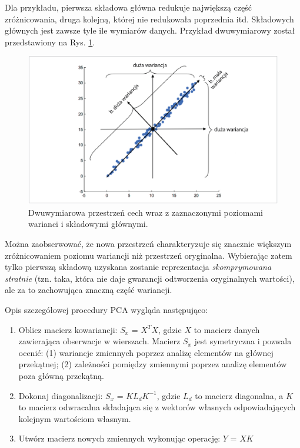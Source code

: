 Dla przykładu, pierwsza składowa główna redukuje największą część zróżnicowania, druga kolejną, której nie redukowała poprzednia itd. Składowych głównych jest zawsze tyle ile wymiarów danych. Przykład dwuwymiarowy został przedstawiony na Rys. \ref{PCA-2dim}.
\begin{figure}[h!]
	\centering
	\includegraphics[width=1\textwidth]{figures/PCA.png}
	\caption{Dwuwymiarowa przestrzeń cech wraz z zaznaczonymi poziomami warianci i składowymi głównymi.}
	\label{PCA-2dim}
\end{figure}
Można zaobserwować, że nowa przestrzeń charakteryzuje się znacznie większym zróżnicowaniem poziomu wariancji niż przestrzeń oryginalna. Wybierając zatem tylko pierwszą składową uzyskana zostanie reprezentacja \textit{skomprymowana stratnie} (tzn. taka, która nie daje gwarancji odtworzenia oryginalnych wartości), ale za to zachowująca znaczną część wariancji.

Opis szczegółowej procedury PCA wygląda następująco:
\begin{enumerate}
\item Oblicz macierz kowariancji: $S_x$ = $X^{T}X$, gdzie $X$ to macierz danych zawierająca obserwacje w wierszach. Macierz $S_x$ jest symetryczna i pozwala ocenić: (1) wariancje zmiennych poprzez analizę elementów na głównej przekątnej; (2) zależności pomiędzy zmiennymi poprzez analizę elementów poza główną przekątną. 
\item Dokonaj diagonalizacji: $S_x$ = $KL_dK^{-1}$, gdzie $L_d$ to macierz diagonalna, a $K$ to macierz odwracalna składająca się z wektorów własnych odpowiadających kolejnym wartościom własnym.
\item Utwórz macierz nowych zmiennych wykonując operację: $Y$ = $XK$
\end{enumerate}

